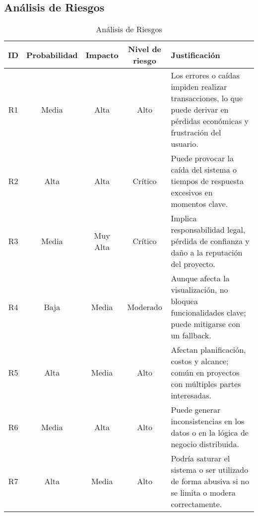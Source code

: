 	\subsection{Análisis de Riesgos}
		\begin{table}[H]
			\centering
			\caption{Análisis de Riesgos}
			\begin{tabularx}{\textwidth}{|c|c|c|c|X|}
				\hline
				\textbf{ID} & \textbf{Probabilidad} & \textbf{Impacto} & \textbf{Nivel de riesgo} & \textbf{Justificación} \\
				\hline
				R1 & Media & Alta & Alto & Los errores o caídas impiden realizar transacciones, lo que puede derivar en pérdidas económicas y frustración del usuario. \\
				\hline
				R2 & Alta & Alta & Crítico & Puede provocar la caída del sistema o tiempos de respuesta excesivos en momentos clave. \\
				\hline
				R3 & Media & Muy Alta & Crítico & Implica responsabilidad legal, pérdida de confianza y daño a la reputación del proyecto. \\
				\hline
				R4 & Baja & Media & Moderado & Aunque afecta la visualización, no bloquea funcionalidades clave; puede mitigarse con un fallback. \\
				\hline
				R5 & Alta & Media & Alto & Afectan planificación, costos y alcance; común en proyectos con múltiples partes interesadas. \\
				\hline
				R6 & Media & Alta & Alto & Puede generar inconsistencias en los datos o en la lógica de negocio distribuida. \\
				\hline
				R7 & Alta & Media & Alto & Podría saturar el sistema o ser utilizado de forma abusiva si no se limita o modera correctamente. \\
				\hline
			\end{tabularx}
		\end{table}
	
